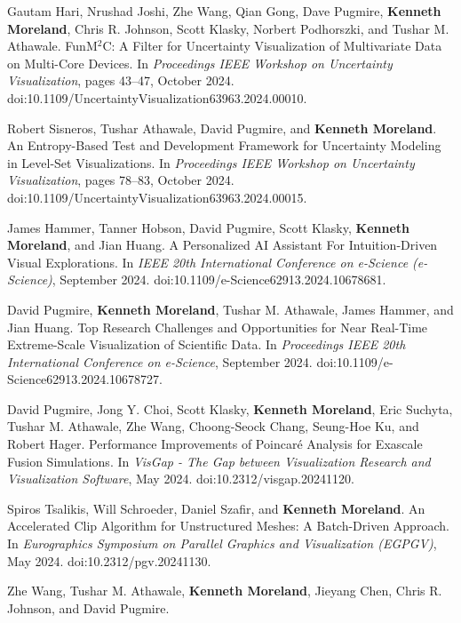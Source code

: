 \begin{enumerate}[label={[\arabic*]}, left=0pt]
\item  %
  Gautam Hari, Nrushad Joshi, Zhe Wang, Qian Gong, Dave Pugmire, \textbf{Kenneth Moreland}, Chris R. Johnson, Scott Klasky, Norbert Podhorszki, and Tushar M. Athawale.
  {FunM$^2$C}: A Filter for Uncertainty Visualization of Multivariate Data on Multi-Core Devices.
  In \emph{Proceedings IEEE Workshop on Uncertainty Visualization}, pages 43--47, October 2024.
  doi:10.1109/UncertaintyVisualization63963.2024.00010.
\item  %
  Robert Sisneros, Tushar Athawale, David Pugmire, and \textbf{Kenneth Moreland}.
  An Entropy-Based Test and Development Framework for Uncertainty Modeling in Level-Set Visualizations.
  In \emph{Proceedings IEEE Workshop on Uncertainty Visualization}, pages 78--83, October 2024.
  doi:10.1109/UncertaintyVisualization63963.2024.00015.
\item  %
  James Hammer, Tanner Hobson, David Pugmire, Scott Klasky, \textbf{Kenneth Moreland}, and Jian Huang.
  A Personalized {AI} Assistant For Intuition-Driven Visual Explorations.
  In \emph{IEEE 20th International Conference on e-Science (e-Science)}, September 2024.
  doi:10.1109/e-Science62913.2024.10678681.
\item  %
  David Pugmire, \textbf{Kenneth Moreland}, Tushar M. Athawale, James Hammer, and Jian Huang.
  Top Research Challenges and Opportunities for Near Real-Time Extreme-Scale Visualization of Scientific Data.
  In \emph{Proceedings IEEE 20th International Conference on e-Science}, September 2024.
  doi:10.1109/e-Science62913.2024.10678727.
\item  %
  David Pugmire, Jong Y. Choi, Scott Klasky, \textbf{Kenneth Moreland}, Eric Suchyta, Tushar M. Athawale, Zhe Wang, Choong-Seock Chang, Seung-Hoe Ku, and Robert Hager.
  Performance Improvements of {Poincar\'{e}} Analysis for Exascale Fusion Simulations.
  In \emph{VisGap - The Gap between Visualization Research and Visualization Software}, May 2024.
  doi:10.2312/visgap.20241120.
\item  %
  Spiros Tsalikis, Will Schroeder, Daniel Szafir, and \textbf{Kenneth Moreland}.
  An Accelerated Clip Algorithm for Unstructured Meshes: A Batch-Driven Approach.
  In \emph{Eurographics Symposium on Parallel Graphics and Visualization (EGPGV)}, May 2024.
  doi:10.2312/pgv.20241130.
\item  %
  Zhe Wang, Tushar M. Athawale, \textbf{Kenneth Moreland}, Jieyang Chen, Chris R. Johnson, and David Pugmire.

\end{enumerate}
